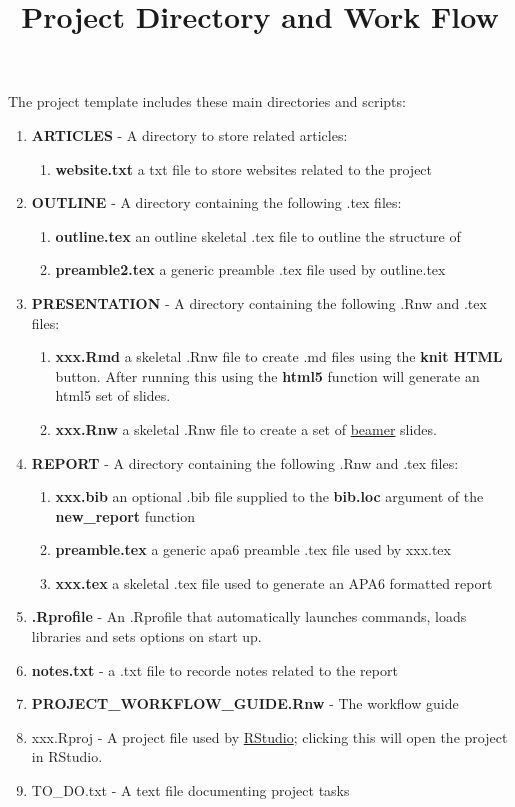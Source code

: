 \documentclass{article}\usepackage{graphicx, color}
\begin{document}
\title{Project Directory and Work Flow}
\author{}
\date{}
\maketitle

The project template includes these main directories and scripts:

\begin{enumerate}
  \item \textbf{ARTICLES} - A directory to store related articles:
  \begin{enumerate}
    \item \textbf{website.txt} a txt file to store websites related to the project
  \end{enumerate}
  \item \textbf{OUTLINE} - A directory containing the following .tex files:
  \begin{enumerate}
    \item \textbf{outline.tex} an outline skeletal .tex file to outline the structure of  
    \item \textbf{preamble2.tex} a generic preamble .tex file used by outline.tex  
  \end{enumerate}  
  \item \textbf{PRESENTATION} - A directory containing the following .Rnw and .tex files:
  \begin{enumerate}
    \item \textbf{xxx.Rmd} a skeletal .Rnw file to create .md files using the \textbf{knit HTML} button.  After running this using the \textbf{html5} function will generate an html5 set of slides.
    \item \textbf{xxx.Rnw} a skeletal .Rnw file to create a set of \href{http://www.math.umbc.edu/~rouben/beamer/}{beamer} slides.   
  \end{enumerate} 
  \item \textbf{REPORT} - A directory containing the following .Rnw and .tex files:
  \begin{enumerate}
    \item \textbf{xxx.bib} an optional .bib file supplied to the \textbf{bib.loc} argument of the \textbf{new\_report} function
    \item \textbf{preamble.tex} a generic apa6 preamble .tex file used by xxx.tex  
    \item \textbf{xxx.tex} a skeletal .tex file used to generate an APA6 formatted report
  \end{enumerate} 
  \item \textbf{.Rprofile} - An .Rprofile that automatically launches commands, loads libraries and sets options on start up.
  \item \textbf{notes.txt} - a .txt file to recorde notes related to the report
  \item \textbf{PROJECT\_WORKFLOW\_GUIDE.Rnw} - The workflow guide
  \item{xxx.Rproj} - A project file used by \href{http://www.rstudio.com/}{RStudio}; clicking this will open the project in RStudio. 
  \item{TO\_DO.txt} - A text file documenting project tasks
\end{enumerate}
\end{document}
